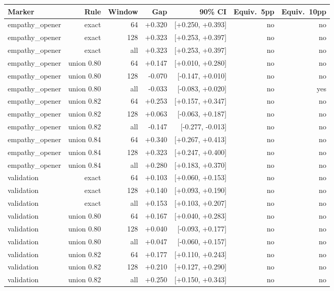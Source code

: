 \begin{tabular}{lrrrrrr}
\toprule
Marker & Rule & Window & Gap & 90\% CI & Equiv.\ 5pp & Equiv.\ 10pp \\
\midrule
empathy\_opener & exact & 64 & +0.320 & [+0.250, +0.393] & no & no \\
empathy\_opener & exact & 128 & +0.323 & [+0.253, +0.397] & no & no \\
empathy\_opener & exact & all & +0.323 & [+0.253, +0.397] & no & no \\
empathy\_opener & union 0.80 & 64 & +0.147 & [+0.010, +0.280] & no & no \\
empathy\_opener & union 0.80 & 128 & -0.070 & [-0.147, +0.010] & no & no \\
empathy\_opener & union 0.80 & all & -0.033 & [-0.083, +0.020] & no & yes \\
empathy\_opener & union 0.82 & 64 & +0.253 & [+0.157, +0.347] & no & no \\
empathy\_opener & union 0.82 & 128 & +0.063 & [-0.063, +0.187] & no & no \\
empathy\_opener & union 0.82 & all & -0.147 & [-0.277, -0.013] & no & no \\
empathy\_opener & union 0.84 & 64 & +0.340 & [+0.267, +0.413] & no & no \\
empathy\_opener & union 0.84 & 128 & +0.323 & [+0.247, +0.400] & no & no \\
empathy\_opener & union 0.84 & all & +0.280 & [+0.183, +0.370] & no & no \\
validation & exact & 64 & +0.103 & [+0.060, +0.153] & no & no \\
validation & exact & 128 & +0.140 & [+0.093, +0.190] & no & no \\
validation & exact & all & +0.153 & [+0.103, +0.207] & no & no \\
validation & union 0.80 & 64 & +0.167 & [+0.040, +0.283] & no & no \\
validation & union 0.80 & 128 & +0.040 & [-0.093, +0.177] & no & no \\
validation & union 0.80 & all & +0.047 & [-0.060, +0.157] & no & no \\
validation & union 0.82 & 64 & +0.177 & [+0.110, +0.243] & no & no \\
validation & union 0.82 & 128 & +0.210 & [+0.127, +0.290] & no & no \\
validation & union 0.82 & all & +0.250 & [+0.150, +0.343] & no & no \\

\end{tabular}

